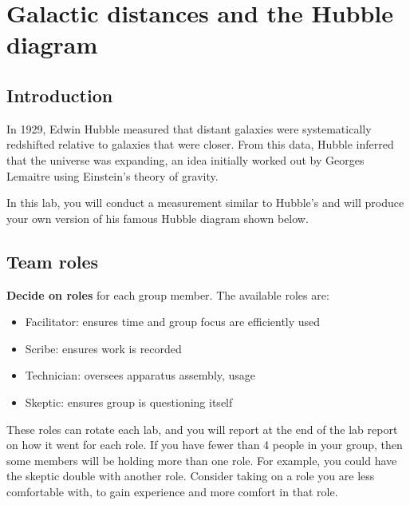 \chapter{Galactic distances and the Hubble diagram}




\section{Introduction}

In 1929, Edwin Hubble measured that distant galaxies were
systematically redshifted relative to galaxies that were closer. From this
data, Hubble inferred that the universe was expanding, an idea initially
worked out by Georges Lemaitre using Einstein's theory of gravity.

In this lab, you will conduct a measurement similar to Hubble's and will
produce your own version of his famous Hubble diagram shown below.

\section{Team roles}

\textbf{Decide on roles} for each group member. The available roles are:

\begin{itemize}
	\item Facilitator: ensures time and group focus are efficiently used
	\item Scribe: ensures work is recorded
	\item Technician: oversees apparatus assembly, usage
	\item Skeptic: ensures group is questioning itself
\end{itemize}

These roles can rotate each lab, and you will report at the end of the lab report on how it went for each role. If you have fewer than 4 people in your group, then some members will be holding more than one role. For example, you could have the skeptic double with another role. Consider taking on a role you are less comfortable with, to gain experience and more comfort in that role.


